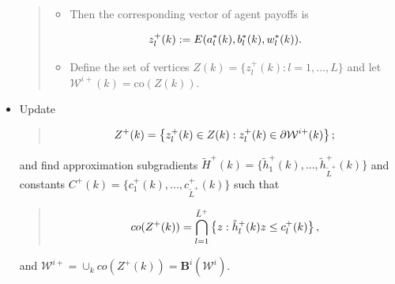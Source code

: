\documentclass[a4paper,10pt,english]{sphinxmanual}
\begin{document}
\begin{itemize}
\begin{quote}
\begin{itemize}
\item {} 
Then the corresponding vector of agent payoffs is

\end{itemize}
\begin{gather}
\begin{split}z^{+}_l (k) := E(a_{l}^{\ast}(k), b_{l}^{\ast}(k), w_{l}^{\ast}(k)).\end{split}\notag
\end{gather}\begin{itemize}
\item {} 
Define the set of vertices \(Z(k) = \{ z^{+}_l (k) : l =
1,...,L \}\) and let \(\mathcal{W}^{i+}(k) = \text{co} (Z(k))\).

\end{itemize}
\end{quote}

\item {} 
Update
\begin{quote}
\begin{gather}
\begin{split}Z^{+}(k) = \left\{ z^{+}_l (k) \in Z(k) : z^{+}_l (k) \in \partial\mathcal{W}^{i+}(k) \right\};\end{split}\notag
\end{gather}\end{quote}

and find approximation subgradients \(\tilde{H}^{+}(k) = \{ \tilde{h}^{+}_1(k),...,\tilde{h}^{+}_{\tilde{L}^{+}}(k) \}\) and constants \(C^{+}(k) = \{c^{+}_1(k),...,c^{+}_{\tilde{L}^+}(k) \}\) such that
\begin{quote}
\begin{gather}
\begin{split}co(Z^{+}(k)) = \bigcap_{l=1}^{\tilde{L}^{+}} \left\{ z: \tilde{h}_l^{+}(k) z \leq
c^{+}_l (k) \right\},\end{split}\notag
\end{gather}\end{quote}

and \(\mathcal{W}^{i+} = \cup_{k} co(Z^{+}(k)) = \mathbf{B}^i (\mathcal{W}^i)\).

\end{itemize}
\end{document}
